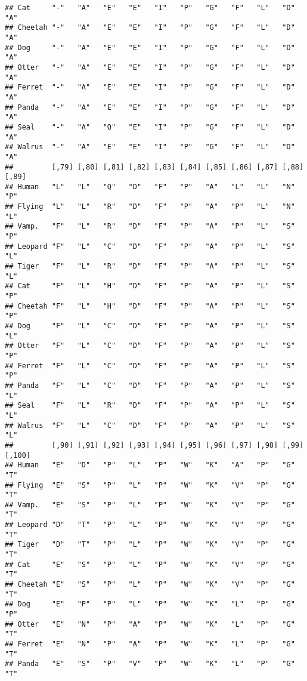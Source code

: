 \documentclass[]{article}
\begin{document}
\begin{verbatim}
## Cat     "-"   "A"   "E"   "E"   "I"   "P"   "G"   "F"   "L"   "D"   "A"  
## Cheetah "-"   "A"   "E"   "E"   "I"   "P"   "G"   "F"   "L"   "D"   "A"  
## Dog     "-"   "A"   "E"   "E"   "I"   "P"   "G"   "F"   "L"   "D"   "A"  
## Otter   "-"   "A"   "E"   "E"   "I"   "P"   "G"   "F"   "L"   "D"   "A"  
## Ferret  "-"   "A"   "E"   "E"   "I"   "P"   "G"   "F"   "L"   "D"   "A"  
## Panda   "-"   "A"   "E"   "E"   "I"   "P"   "G"   "F"   "L"   "D"   "A"  
## Seal    "-"   "A"   "Q"   "E"   "I"   "P"   "G"   "F"   "L"   "D"   "A"  
## Walrus  "-"   "A"   "E"   "E"   "I"   "P"   "G"   "F"   "L"   "D"   "A"  
##         [,79] [,80] [,81] [,82] [,83] [,84] [,85] [,86] [,87] [,88] [,89]
## Human   "L"   "L"   "Q"   "D"   "F"   "P"   "A"   "L"   "L"   "N"   "P"  
## Flying  "L"   "L"   "R"   "D"   "F"   "P"   "A"   "P"   "L"   "N"   "L"  
## Vamp.   "F"   "L"   "R"   "D"   "F"   "P"   "A"   "P"   "L"   "S"   "P"  
## Leopard "F"   "L"   "C"   "D"   "F"   "P"   "A"   "P"   "L"   "S"   "L"  
## Tiger   "F"   "L"   "R"   "D"   "F"   "P"   "A"   "P"   "L"   "S"   "L"  
## Cat     "F"   "L"   "H"   "D"   "F"   "P"   "A"   "P"   "L"   "S"   "P"  
## Cheetah "F"   "L"   "H"   "D"   "F"   "P"   "A"   "P"   "L"   "S"   "P"  
## Dog     "F"   "L"   "C"   "D"   "F"   "P"   "A"   "P"   "L"   "S"   "L"  
## Otter   "F"   "L"   "C"   "D"   "F"   "P"   "A"   "P"   "L"   "S"   "P"  
## Ferret  "F"   "L"   "C"   "D"   "F"   "P"   "A"   "P"   "L"   "S"   "P"  
## Panda   "F"   "L"   "C"   "D"   "F"   "P"   "A"   "P"   "L"   "S"   "L"  
## Seal    "F"   "L"   "R"   "D"   "F"   "P"   "A"   "P"   "L"   "S"   "L"  
## Walrus  "F"   "L"   "C"   "D"   "F"   "P"   "A"   "P"   "L"   "S"   "L"  
##         [,90] [,91] [,92] [,93] [,94] [,95] [,96] [,97] [,98] [,99] [,100]
## Human   "E"   "D"   "P"   "L"   "P"   "W"   "K"   "A"   "P"   "G"   "T"   
## Flying  "E"   "S"   "P"   "L"   "P"   "W"   "K"   "V"   "P"   "G"   "T"   
## Vamp.   "E"   "S"   "P"   "L"   "P"   "W"   "K"   "V"   "P"   "G"   "T"   
## Leopard "D"   "T"   "P"   "L"   "P"   "W"   "K"   "V"   "P"   "G"   "T"   
## Tiger   "D"   "T"   "P"   "L"   "P"   "W"   "K"   "V"   "P"   "G"   "T"   
## Cat     "E"   "S"   "P"   "L"   "P"   "W"   "K"   "V"   "P"   "G"   "T"   
## Cheetah "E"   "S"   "P"   "L"   "P"   "W"   "K"   "V"   "P"   "G"   "T"   
## Dog     "E"   "P"   "P"   "L"   "P"   "W"   "K"   "L"   "P"   "G"   "P"   
## Otter   "E"   "N"   "P"   "A"   "P"   "W"   "K"   "L"   "P"   "G"   "T"   
## Ferret  "E"   "N"   "P"   "A"   "P"   "W"   "K"   "L"   "P"   "G"   "T"   
## Panda   "E"   "S"   "P"   "V"   "P"   "W"   "K"   "L"   "P"   "G"   "T"   

\end{verbatim}
\end{document}
